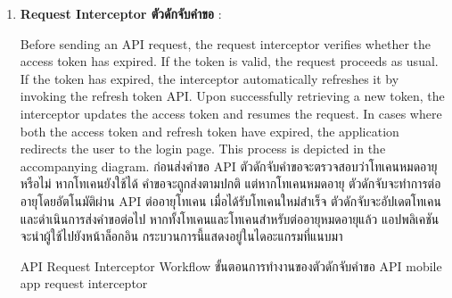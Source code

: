 \begin{enumerate}
    \item \textbf{\ifenglish Request Interceptor \else ตัวดักจับคำขอ \fi}: 

    \ifenglish
    Before sending an API request, the request interceptor verifies whether the access token has expired. If the token is valid, the request proceeds as usual. If the token has expired, the interceptor automatically refreshes it by invoking the refresh token API. Upon successfully retrieving a new token, the interceptor updates the access token and resumes the request. In cases where both the access token and refresh token have expired, the application redirects the user to the login page. This process is depicted in the accompanying diagram.
    \else
    ก่อนส่งคำขอ API ตัวดักจับคำขอจะตรวจสอบว่าโทเคนหมดอายุหรือไม่ หากโทเคนยังใช้ได้ คำขอจะถูกส่งตามปกติ แต่หากโทเคนหมดอายุ ตัวดักจับจะทำการต่ออายุโดยอัตโนมัติผ่าน API ต่ออายุโทเคน เมื่อได้รับโทเคนใหม่สำเร็จ ตัวดักจับจะอัปเดตโทเคนและดำเนินการส่งคำขอต่อไป หากทั้งโทเคนและโทเคนสำหรับต่ออายุหมดอายุแล้ว แอปพลิเคชันจะนำผู้ใช้ไปยังหน้าล็อกอิน กระบวนการนี้แสดงอยู่ในไดอะแกรมที่แนบมา
    \fi

    {\ifenglish API Request Interceptor Workflow \else ขั้นตอนการทำงานของตัวดักจับคำขอ API \fi}
    {mobile app request interceptor}



\end{enumerate}